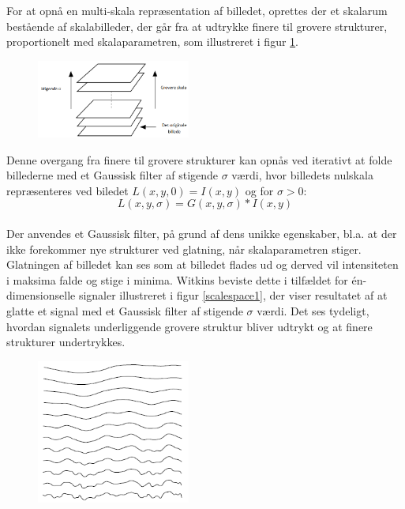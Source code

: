 For at opnå en multi-skala repræsentation af billedet, oprettes der et skalarum bestående af skalabilleder, der går fra at udtrykke finere til grovere strukturer, proportionelt med skalaparametren, som illustreret i figur \ref{fig:scalerep}. 
\begin{figure}[H]
    \centering
    \includegraphics[width=0.45\textwidth]{fig/32.png}
     \vspace{-1em}
    \begin{center}    
       \caption{\textcolor{gray}{\footnotesize \textit{ }}}
    \label{fig:scalerep}
     \end{center}
     \vspace{-2.5em}
  \end{figure} \noindent
Denne overgang fra finere til grovere strukturer kan opnås ved iterativt at folde billederne med et Gaussisk filter af stigende $\sigma$ værdi, hvor billedets nulskala repræsenteres ved biledet $ L(x,y,0) = I(x,y)$ og for $\sigma>0$:
\begin{equation}
L(x,y,\sigma) = G(x,y,\sigma)\ast I(x,y)
\label{scalespace1}
\end{equation}
\\
Der anvendes et Gaussisk filter, på grund af dens unikke egenskaber,  bl.a. at der ikke forekommer nye strukturer ved glatning, når skalaparametren stiger. Glatningen af billedet kan ses som at billedet flades ud og derved vil intensiteten i maksima falde og stige i minima.  Witkins \cite{witkins} beviste dette i tilfældet for én-dimensionselle signaler illustreret i  figur  \ref{scalespace1}, der viser resultatet af at glatte et signal med et Gaussisk filter af stigende $\sigma$ værdi. Det ses tydeligt, hvordan signalets underliggende grovere struktur bliver udtrykt og at finere strukturer undertrykkes.
\begin{figure}[H]
    \centering
    \includegraphics[width=0.45\textwidth]{fig/33.png}
     \vspace{-1em}
    \begin{center}    
       \caption{\textcolor{gray}{\footnotesize \textit{ }}}
    \label{fig:scalereps}
     \end{center}
     \vspace{-2.5em}
  \end{figure} \noindent
